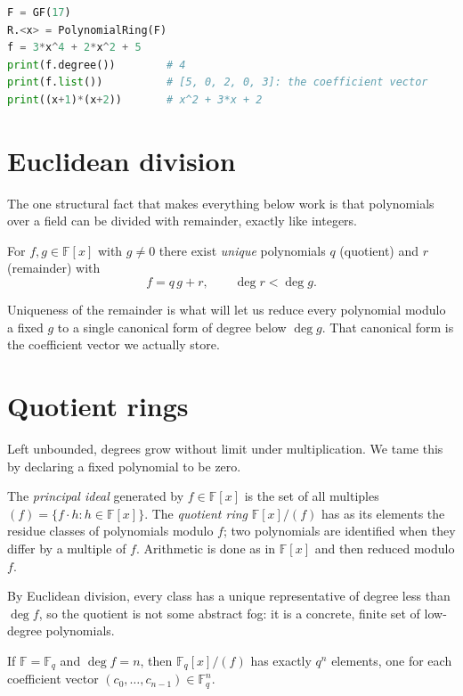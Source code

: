 \begin{lstlisting}[language=Python]
F = GF(17)
R.<x> = PolynomialRing(F)
f = 3*x^4 + 2*x^2 + 5
print(f.degree())        # 4
print(f.list())          # [5, 0, 2, 0, 3]: the coefficient vector
print((x+1)*(x+2))       # x^2 + 3*x + 2
\end{lstlisting}

\section{Euclidean division}
The one structural fact that makes everything below work is that polynomials over a field can be divided with remainder, exactly like integers.

\begin{theorem}
For $f,g\in\mathbb{F}[x]$ with $g\neq 0$ there exist \emph{unique} polynomials $q$ (quotient) and $r$ (remainder) with
\[
f = q\,g + r, \qquad \deg r < \deg g.
\]
\end{theorem}

Uniqueness of the remainder is what will let us reduce every polynomial modulo a fixed $g$ to a single canonical form of degree below $\deg g$. That canonical form is the coefficient vector we actually store.

\section{Quotient rings}
Left unbounded, degrees grow without limit under multiplication. We tame this by declaring a fixed polynomial to be zero.

\begin{definition}
The \emph{principal ideal} generated by $f\in\mathbb{F}[x]$ is the set of all multiples $(f)=\{f\cdot h : h\in\mathbb{F}[x]\}$. The \emph{quotient ring} $\mathbb{F}[x]/(f)$ has as its elements the residue classes of polynomials modulo $f$; two polynomials are identified when they differ by a multiple of $f$. Arithmetic is done as in $\mathbb{F}[x]$ and then reduced modulo $f$.
\end{definition}

By Euclidean division, every class has a unique representative of degree less than $\deg f$, so the quotient is not some abstract fog: it is a concrete, finite set of low-degree polynomials.

\begin{proposition}
If $\mathbb{F}=\mathbb{F}_q$ and $\deg f = n$, then $\mathbb{F}_q[x]/(f)$ has exactly $q^n$ elements, one for each coefficient vector $(c_0,\dots,c_{n-1})\in\mathbb{F}_q^n$.
\end{proposition}

